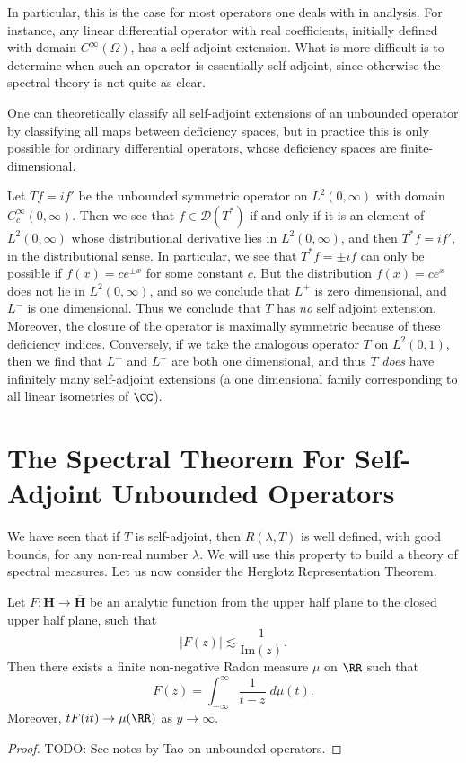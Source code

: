 In particular, this is the case for most operators one deals with in analysis. For instance, any linear differential operator with real coefficients, initially defined with domain $C^\infty(\Omega)$, has a self-adjoint extension. What is more difficult is to determine when such an operator is essentially self-adjoint, since otherwise the spectral theory is not quite as clear.

One can theoretically classify all self-adjoint extensions of an unbounded operator by classifying all maps between deficiency spaces, but in practice this is only possible for ordinary differential operators, whose deficiency spaces are finite-dimensional.

\begin{example}
    Let $Tf = if'$ be the unbounded symmetric operator on $L^2(0,\infty)$ with domain $C_c^\infty(0,\infty)$. Then we see that $f \in \mathcal{D}(T^*)$ if and only if it is an element of $L^2(0,\infty)$ whose distributional derivative lies in $L^2(0,\infty)$, and then $T^*f = if'$, in the distributional sense. In particular, we see that $T^*f = \pm if$ can only be possible if $f(x) = c e^{\pm x}$ for some constant $c$. But the distribution $f(x) = c e^x$ does not lie in $L^2(0,\infty)$, and so we conclude that $L^+$ is zero dimensional, and $L^-$ is one dimensional. Thus we conclude that $T$ has \emph{no} self adjoint extension. Moreover, the closure of the operator is maximally symmetric because of these deficiency indices. Conversely, if we take the analogous operator $T$ on $L^2(0,1)$, then we find that $L^+$ and $L^-$ are both one dimensional, and thus $T$ \emph{does} have infinitely many self-adjoint extensions (a one dimensional family corresponding to all linear isometries of $\CC$).
\end{example}

\section{The Spectral Theorem For Self-Adjoint Unbounded Operators}

We have seen that if $T$ is self-adjoint, then $R(\lambda,T)$ is well defined, with good bounds, for any non-real number $\lambda$. We will use this property to build a theory of spectral measures. Let us now consider the Herglotz Representation Theorem.

\begin{theorem}
    Let $F: \mathbf{H} \to \overline{\mathbf{H}}$ be an analytic function from the upper half plane to the closed upper half plane, such that
    \[ |F(z)| \lesssim \frac{1}{\text{Im}(z)}. \]
    Then there exists a finite non-negative Radon measure $\mu$ on $\RR$ such that
    \[ F(z) = \int_{-\infty}^\infty \frac{1}{t - z}\; d\mu(t). \]
    Moreover, $t F(it) \to \mu(\RR)$ as $y \to \infty$.
\end{theorem}
\begin{proof}
    TODO: See notes by Tao on unbounded operators.
\end{proof}

